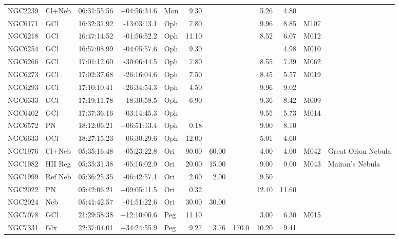 \documentclass[11pt]{article}
\begin{document}
\begin{longtable}{llrrlrrrrrrl}
  NGC2239 & Cl+Neb  & 06:31:55.56 & +04:56:34.6 & Mon & 9.30   &        &       & 5.26  & 4.80   &      & \\
  NGC6171 & GCl     & 16:32:31.92 & -13:03:13.1 & Oph & 7.80   &        &       & 9.96  & 8.85   & M107 & \\
  NGC6218 & GCl     & 16:47:14.52 & -01:56:52.2 & Oph & 11.10  &        &       & 8.52  & 6.07   & M012 & \\
  NGC6254 & GCl     & 16:57:08.99 & -04:05:57.6 & Oph & 9.30   &        &       &       & 4.98   & M010 & \\
  NGC6266 & GCl     & 17:01:12.60 & -30:06:44.5 & Oph & 7.80   &        &       & 8.55  & 7.39   & M062 & \\
  NGC6273 & GCl     & 17:02:37.68 & -26:16:04.6 & Oph & 7.50   &        &       & 8.45  & 5.57   & M019 & \\
  NGC6293 & GCl     & 17:10:10.41 & -26:34:54.3 & Oph & 4.50   &        &       & 9.96  & 9.02   &      & \\
  NGC6333 & GCl     & 17:19:11.78 & -18:30:58.5 & Oph & 6.90   &        &       & 9.36  & 8.42   & M009 & \\
  NGC6402 & GCl     & 17:37:36.16 & -03:14:45.3 & Oph &        &        &       & 9.55  & 5.73   & M014 & \\
  NGC6572 & PN      & 18:12:06.21 & +06:51:13.4 & Oph & 0.18   &        &       & 9.00  & 8.10   &      & \\
  NGC6633 & OCl     & 18:27:15.23 & +06:30:29.6 & Oph & 12.00  &        &       & 5.01  & 4.60   &      & \\
  NGC1976 & Cl+Neb  & 05:35:16.48 & -05:23:22.8 & Ori & 90.00  & 60.00  &       & 4.00  & 4.00   & M042 & Great Orion Nebula\\
  NGC1982 & HII Reg & 05:35:31.38 & -05:16:02.9 & Ori & 20.00  & 15.00  &       & 9.00  & 9.00   & M043 & Mairan's Nebula \\
  NGC1999 & Ref Neb & 05:36:25.35 & -06:42:57.1 & Ori & 2.00   & 2.00   &       & 9.50  &        &      & \\
  NGC2022 & PN      & 05:42:06.21 & +09:05:11.5 & Ori & 0.32   &        &       & 12.40 & 11.60  &      & \\
  NGC2024 & Neb     & 05:41:42.57 & -01:51:22.6 & Ori & 30.00  & 30.00  &       &       &        &      & \\
  NGC7078 & GCl     & 21:29:58.38 & +12:10:00.6 & Peg & 11.10  &        &       & 3.00  & 6.30   & M015 & \\
  NGC7331 & Glx     & 22:37:04.01 & +34:24:55.9 & Peg & 9.27   & 3.76   & 170.0 & 10.20 & 9.41   &      & \\

\end{longtable}
\end{document}
